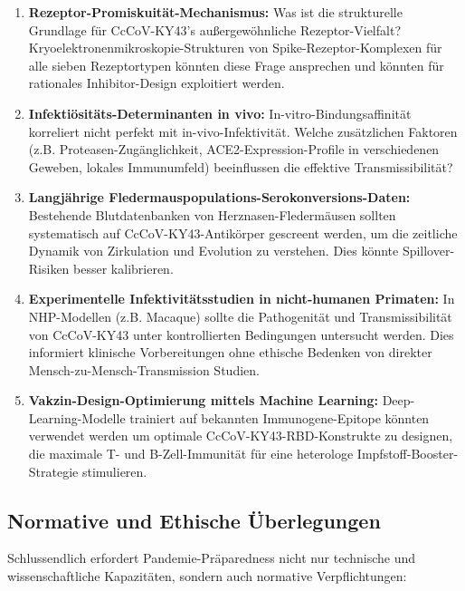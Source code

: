 ﻿\documentclass[11pt,a4paper]{article}
\theoremstyle{definition}
\begin{document}
\begin{enumerate}
\item \textbf{Rezeptor-Promiskuität-Mechanismus:} Was ist die strukturelle Grundlage für CcCoV-KY43's außergewöhnliche Rezeptor-Vielfalt? Kryoelektronenmikroskopie-Strukturen von Spike-Rezeptor-Komplexen für alle sieben Rezeptortypen könnten diese Frage ansprechen und könnten für rationales Inhibitor-Design exploitiert werden.

\item \textbf{Infektiösitäts-Determinanten in vivo:} In-vitro-Bindungsaffinität korreliert nicht perfekt mit in-vivo-Infektivität. Welche zusätzlichen Faktoren (z.B. Proteasen-Zugänglichkeit, ACE2-Expression-Profile in verschiedenen Geweben, lokales Immunumfeld) beeinflussen die effektive Transmissibilität?

\item \textbf{Langjährige Fledermauspopulations-Serokonversions-Daten:} Bestehende Blutdatenbanken von Herznasen-Fledermäusen sollten systematisch auf CcCoV-KY43-Antikörper gescreent werden, um die zeitliche Dynamik von Zirkulation und Evolution zu verstehen. Dies könnte Spillover-Risiken besser kalibrieren.

\item \textbf{Experimentelle Infektivitätsstudien in nicht-humanen Primaten:} In NHP-Modellen (z.B. Macaque) sollte die Pathogenität und Transmissibilität von CcCoV-KY43 unter kontrollierten Bedingungen untersucht werden. Dies informiert klinische Vorbereitungen ohne ethische Bedenken von direkter Mensch-zu-Mensch-Transmission Studien.

\item \textbf{Vakzin-Design-Optimierung mittels Machine Learning:} Deep-Learning-Modelle trainiert auf bekannten Immunogene-Epitope könnten verwendet werden um optimale CcCoV-KY43-RBD-Konstrukte zu designen, die maximale T- und B-Zell-Immunität für eine heterologe Impfstoff-Booster-Strategie stimulieren.
\end{enumerate}

\subsection{Normative und Ethische Überlegungen}

Schlussendlich erfordert Pandemie-Präparedness nicht nur technische und wissenschaftliche Kapazitäten, sondern auch normative Verpflichtungen:
\end{document}
